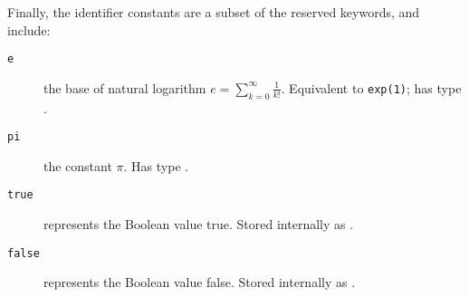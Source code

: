 \noindent Finally, the identifier constants are a subset of the reserved keywords, and include:
\begin{description}
  \item[\texttt{e}] the base of natural logarithm $e=\sum_{k=0}^\infty \frac{1}{k!}$. Equivalent to \texttt{exp(1)}; has type \complex.
  \item[\texttt{pi}] the constant $\pi$. Has type \float.
  \item[\texttt{true}] represents the Boolean value \textsf{true}. Stored internally  as .
  \item[\texttt{false}] represents the Boolean value \textsf{false}. Stored internally  as .
\end{description}
